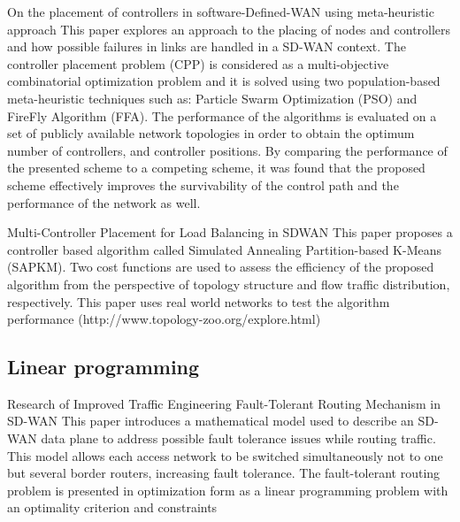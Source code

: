 \paperEntry
{On the placement of controllers in software-Defined-WAN using meta-heuristic approach \cite{controller_placements} }
{This paper explores an approach to the placing of nodes and controllers and how possible failures in links are handled in a SD-WAN context. The controller placement problem (CPP) is considered as a multi-objective combinatorial optimization problem and  it is solved using two population-based meta-heuristic techniques such as: Particle Swarm Optimization (PSO) and FireFly Algorithm (FFA). The performance of the algorithms is evaluated on a set of publicly available network topologies in order to obtain the optimum number of controllers, and controller positions. By comparing the performance of the presented scheme to a competing scheme, it was found that the proposed scheme effectively improves the survivability of the control path and the performance of the network as well.}

\paperEntry
{Multi-Controller Placement for
	Load Balancing in SDWAN \cite{multiple_placements} }
{This paper proposes a controller based algorithm called Simulated Annealing Partition-based K-Means (SAPKM). Two cost functions are used to assess the efficiency of the proposed algorithm from the perspective of topology structure and flow traffic distribution, respectively.
	This paper uses real world networks to test the algorithm performance (http://www.topology-zoo.org/explore.html)}	

\subsection{Linear programming}

\paperEntry
{Research of Improved Traffic Engineering Fault-Tolerant Routing Mechanism in SD-WAN \cite{fault_tolerant}}
{This paper introduces a mathematical model used to describe an SD-WAN data plane to address possible fault tolerance issues while routing traffic. This model allows each access network to be switched simultaneously not to one but several border routers, increasing fault tolerance.
	The fault-tolerant routing problem is presented in
	optimization form as a linear programming problem with an
	optimality criterion and constraints}